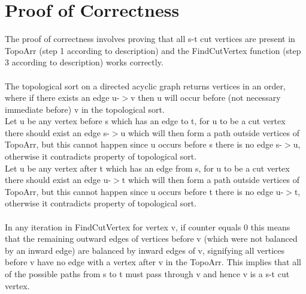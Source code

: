 \documentclass{article}
\begin{document}
\section{Proof of Correctness}
The proof of correctness involves proving that all s-t cut vertices are present in TopoArr (step 1 according to description) and the FindCutVertex function (step 3 according to description) works correctly.
\\
\\The topological sort on a directed acyclic graph returns vertices in an order, where if there exists an edge u-$>$v then u will occur before (not necessary immediate before) v in the topological sort.
\\Let u be any vertex before s which has an edge to t, for u to be a cut vertex there should exist an edge s-$>$u which will then form a path outside vertices of TopoArr, but this cannot happen since u occurs before s there is no edge s-$>$u, otherwise it contradicts property of topological sort.
\\Let u be any vertex after t which has an edge from s, for u to be a cut vertex there should exist an edge u-$>$t which will then form a path outside vertices of TopoArr, but this cannot happen since u occurs before t there is no edge u-$>$t, otherwise it contradicts property of topological sort.
\\
\\In any iteration in FindCutVertex for vertex v, if counter equals 0 this means that the remaining outward edges of vertices before v (which were not balanced by an inward edge)  are balanced by inward edges of v, signifying all vertices before v have no edge with a vertex after v in the TopoArr.
This implies that all of the possible paths from s to t must pass through v and hence v is a s-t cut vertex.
\end{document}
